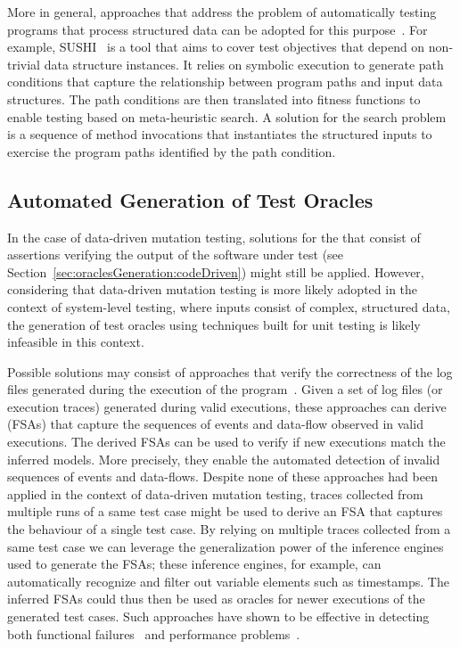 More in general, approaches that address the problem of automatically testing programs that process structured data can be adopted for this purpose~\cite{Kiran:2008,Braione:2017,Braione:2018}. For example, SUSHI~\cite{Braione:2018} is a tool that aims to cover test objectives that depend on non-trivial data structure instances.
It relies on symbolic execution to generate path conditions that capture the relationship between program paths and input data structures. The path conditions are then translated into fitness functions to enable testing based on meta-heuristic search. A solution for the search problem is a sequence of method invocations that instantiates the structured inputs to exercise the program paths identified by the path condition.

\subsection{Automated Generation of Test Oracles}
\label{sec:oracles:dataMutation}

In the case of data-driven mutation testing, solutions for the  that consist of assertions verifying the output of the software under test (see Section~\ref{sec:oraclesGeneration:codeDriven}) might still be applied. However, considering that data-driven mutation testing is more likely adopted in the context of system-level testing, where inputs consist of complex, structured data, the generation of test oracles using techniques built for unit testing is likely infeasible in this context.

Possible solutions may consist of approaches that verify the correctness of the log files generated during the execution of the program~\cite{Pastore:ISSRE:08,Pastore:TKT:17}.
Given a set of log files (or execution traces) generated during valid executions, these approaches can derive  (FSAs) that capture the sequences of events and data-flow observed in valid executions. The derived FSAs can be used to verify if new executions match the inferred models. More precisely, they enable the automated detection of invalid sequences of events and data-flows. Despite none of these approaches had been applied in the context of data-driven mutation testing, traces collected from multiple runs of a same test case might be used to derive an FSA that captures the behaviour of a single test case. By relying on multiple traces collected from a same test case we can leverage the generalization power of the inference engines used to generate the FSAs; these inference engines, for example, can automatically recognize and filter out variable elements such as timestamps. The inferred FSAs could thus then be used as oracles for newer executions of the generated test cases. Such approaches have shown to be effective in detecting both functional failures~\cite{Pastore:ISSRE:08} and performance problems~\cite{Pastore:TKT:17}.
